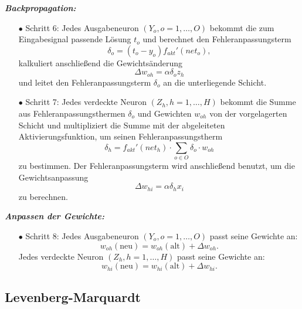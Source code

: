\textbf{\textit{Backpropagation:}}
\begin{itemize}
\item[\textbf{$\bullet$}] Schritt 6: Jedes Ausgabeneuron $(Y_{o}, o=1,\dots,O)$ bekommt die zum Eingabesignal passende Lösung $t_{o}$ und berechnet den Fehleranpassungsterm 
\begin{equation}
\delta_{o}=(t_{o}-y_{o})f_{akt}'(net_{o}),
\end{equation}
kalkuliert anschließend die Gewichtsänderung 
\begin{equation}
\Delta w_{oh}=\alpha \delta_{o} z_{h}
\end{equation}
und leitet den Fehleranpassungsterm $\delta_{o}$ an die unterliegende Schicht.

\item[\textbf{$\bullet$}] Schritt 7: Jedes verdeckte Neuron $(Z_{h}, h=1,\dots,H)$ bekommt die Summe aus Fehleranpassungsthermen $\delta_o$ und Gewichten $w_{oh}$ von der vorgelagerten Schicht und multipliziert die Summe mit der abgeleiteten Aktivierungsfunktion, um seinen Fehleranpassungstherm 
\begin{equation}
\delta_{h}=f_{akt}'(net_{h}) \cdot \sum\limits_{o \in O} \delta_{o} \cdot w_{oh}
\end{equation}
zu bestimmen. Der Fehleranpassungsterm wird anschließend benutzt, um die Gewichtsanpassung 
\begin{equation}
\Delta w_{hi}=\alpha \delta_{h} x_{i}
\end{equation}
zu berechnen.
\end{itemize}

\textbf{\textit{Anpassen der Gewichte:}}
\begin{itemize}
\item[\textbf{$\bullet$}] Schritt 8: Jedes Ausgabeneuron $(Y_{o}, o=1,\dots,O)$ passt seine Gewichte an: 
\begin{equation}
w_{oh}(\text{neu})=w_{oh}(\text{alt})+\Delta w_{oh}.
\end{equation}
Jedes verdeckte Neuron $(Z_{h}, h=1,\dots,H)$ passt seine Gewichte an:
\begin{equation}
w_{hi}(\text{neu})=w_{hi}(\text{alt})+\Delta w_{hi}.
\end{equation}

\end{itemize}

\subsection{Levenberg-Marquardt}\label{sec:LM_herleitung}


